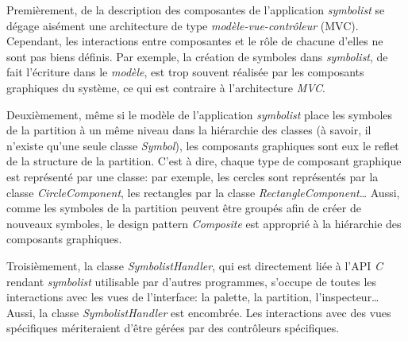 Premièrement, de la description des composantes de l'application \textit{symbolist} se dégage aisément une architecture de type \textit{modèle-vue-contrôleur} (MVC). Cependant, les interactions entre composantes et le rôle de chacune d'elles ne sont pas biens définis. Par exemple, la création de symboles dans \textit{symbolist}, de fait l'écriture dans le \textit{modèle}, est trop souvent réalisée par les composants graphiques du système, ce qui est contraire à l'architecture \textit{MVC}. 

Deuxièmement, même si le modèle de l'application \textit{symbolist} place les symboles de la partition à un même niveau dans la hiérarchie des classes (à savoir, il n'existe qu'une seule classe \textit{Symbol}), les composants graphiques sont eux le reflet de la structure de la partition.
C'est à dire, chaque type de composant graphique est représenté par une classe: par exemple, les cercles sont représentés par la classe \textit{CircleComponent}, les rectangles par la classe \textit{RectangleComponent}…
Aussi, comme les symboles de la partition peuvent être groupés afin de créer de nouveaux symboles, le design pattern \textit{Composite} est approprié à la hiérarchie des composants graphiques. 

Troisièmement, la classe \textit{SymbolistHandler}, qui est directement liée à l'API \textit{C} rendant \textit{symbolist} utilisable par d'autres programmes, s'occupe de toutes les interactions avec les vues de l'interface: la palette, la partition, l'inspecteur… Aussi, la classe \textit{SymbolistHandler} est encombrée. Les interactions avec des vues spécifiques mériteraient d'être gérées par des contrôleurs spécifiques.
